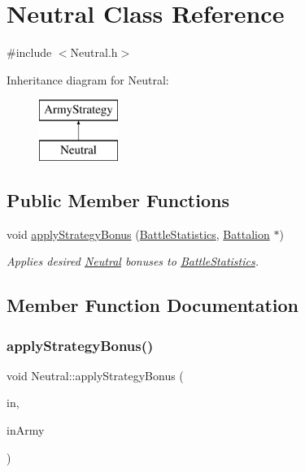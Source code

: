 \hypertarget{class_neutral}{}\section{Neutral Class Reference}
\label{class_neutral}


{\ttfamily \#include $<$Neutral.\+h$>$}

Inheritance diagram for Neutral\+:\begin{figure}[H]
\begin{center}
\leavevmode
\includegraphics[height=2.000000cm]{class_neutral}
\end{center}
\end{figure}
\subsection*{Public Member Functions}
\begin{DoxyCompactItemize}
\item 
void \mbox{\hyperlink{class_neutral_aa6ce5f87e34cf849324d42031e2901d1}{apply\+Strategy\+Bonus}} (\mbox{\hyperlink{class_battle_statistics}{Battle\+Statistics}}, \mbox{\hyperlink{class_battalion}{Battalion}} $\ast$)
\begin{DoxyCompactList}\small\item\em Applies desired \mbox{\hyperlink{class_neutral}{Neutral}} bonuses to \mbox{\hyperlink{class_battle_statistics}{Battle\+Statistics}}. \end{DoxyCompactList}\end{DoxyCompactItemize}


\subsection{Member Function Documentation}
\mbox{\label{class_neutral_aa6ce5f87e34cf849324d42031e2901d1}} 
\subsubsection{\texorpdfstring{applyStrategyBonus()}{applyStrategyBonus()}}
{\footnotesize\ttfamily void Neutral\+::apply\+Strategy\+Bonus (\begin{DoxyParamCaption}\item[{\mbox{\hyperlink{class_battle_statistics}{Battle\+Statistics}}}]{in,  }\item[{\mbox{\hyperlink{class_battalion}{Battalion}} $\ast$}]{in\+Army }\end{DoxyParamCaption})\hspace{0.3cm}{\ttfamily [virtual]}}



